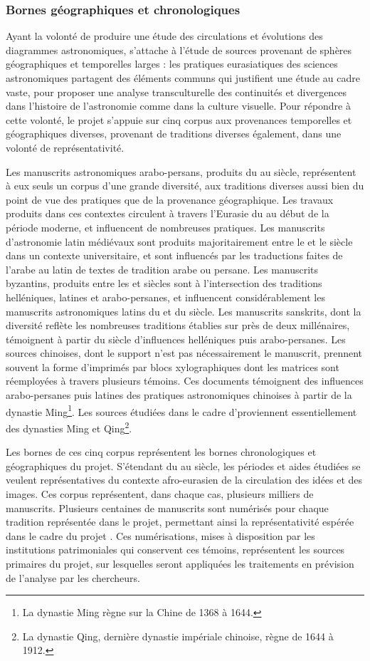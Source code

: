         \subsubsection{Bornes géographiques et chronologiques}
Ayant la volonté de produire une étude des circulations et évolutions des diagrammes astronomiques, \eida s'attache à l'étude de sources provenant de sphères géographiques et temporelles larges : les pratiques eurasiatiques des sciences astronomiques partagent des éléments communs qui justifient une étude au cadre vaste, pour proposer une analyse transculturelle des continuités et divergences dans l'histoire de l'astronomie comme dans la culture visuelle. Pour répondre à cette volonté, le projet \eida s'appuie sur cinq corpus aux provenances temporelles et géographiques diverses, provenant de traditions diverses également, dans une volonté de représentativité. 

Les manuscrits astronomiques arabo-persans, produits du \viii au \xviii siècle, représentent à eux seuls un corpus d'une grande diversité, aux traditions diverses aussi bien du point de vue des pratiques que de la provenance géographique. Les travaux produits dans ces contextes circulent à travers l'Eurasie du \ma au début de la période moderne, et influencent de nombreuses pratiques. Les manuscrits d'astronomie latin médiévaux sont produits majoritairement entre le \xiii et le \xvi siècle dans un contexte universitaire, et sont influencés par les traductions faites de l'arabe au latin de textes de tradition arabe ou persane. Les manuscrits byzantins, produits entre les \ix et \xv siècles sont à l'intersection des traditions helléniques, latines et arabo-persanes, et influencent considérablement les manuscrits astronomiques latins du \xv et du \xvi siècle. Les manuscrits sanskrits, dont la diversité reflète les nombreuses traditions établies sur près de deux millénaires, témoignent à partir du \xie siècle d'influences helléniques puis arabo-persanes. Les sources chinoises, dont le support n'est pas nécessairement le manuscrit, prennent souvent la forme d'imprimés par blocs xylographiques dont les matrices sont réemployées à travers plusieurs témoins. Ces documents témoignent des influences arabo-persanes puis latines des pratiques astronomiques chinoises à partir de la dynastie Ming\footnote{La dynastie Ming règne sur la Chine de 1368 à 1644.}. Les sources étudiées dans le cadre d'\eida proviennent essentiellement des dynasties Ming et Qing\footnote{La dynastie Qing, dernière dynastie impériale chinoise, règne de 1644 à 1912.}.

Les bornes de ces cinq corpus représentent les bornes chronologiques et géographiques du projet. S'étendant du \viii au \xviii siècle, les périodes et aides étudiées se veulent représentatives du contexte afro-eurasien de la circulation des idées et des images. Ces corpus représentent, dans chaque cas, plusieurs milliers de manuscrits. Plusieurs centaines de manuscrits sont numérisés pour chaque tradition représentée dans le projet, permettant ainsi la représentativité espérée dans le cadre du projet \eida. Ces numérisations, mises à disposition par les institutions patrimoniales qui conservent ces témoins, représentent les sources primaires du projet, sur lesquelles seront appliquées les traitements en prévision de l'analyse par les chercheurs.
